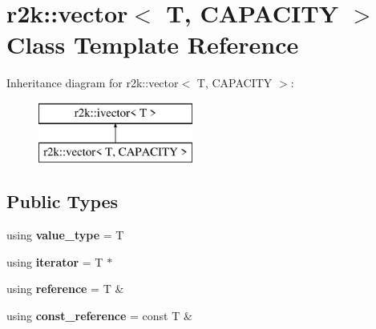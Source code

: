 \hypertarget{classr2k_1_1vector}{}\section{r2k\+::vector$<$ T, C\+A\+P\+A\+C\+I\+TY $>$ Class Template Reference}
\label{classr2k_1_1vector}
Inheritance diagram for r2k\+::vector$<$ T, C\+A\+P\+A\+C\+I\+TY $>$\+:\begin{figure}[H]
\begin{center}
\leavevmode
\includegraphics[height=2.000000cm]{classr2k_1_1vector}
\end{center}
\end{figure}
\subsection*{Public Types}
\begin{DoxyCompactItemize}
\item 
\mbox{\label{classr2k_1_1vector_a9739a9c18db0500ee97ba4070c9b01cf}} 
using {\bfseries value\+\_\+type} = T
\item 
\mbox{\label{classr2k_1_1vector_ac0124e2cc6a974eed52ffb62de966b5f}} 
using {\bfseries iterator} = T $\ast$
\item 
\mbox{\label{classr2k_1_1vector_aba7ed5b7b6e16ff08a8a0e85fe3a9ef8}} 
using {\bfseries reference} = T \&
\item 
\mbox{\label{classr2k_1_1vector_a9cb5351b24fb72b7841fe05f5bf3911b}} 
using {\bfseries const\+\_\+reference} = const T \&
\end{DoxyCompactItemize}
